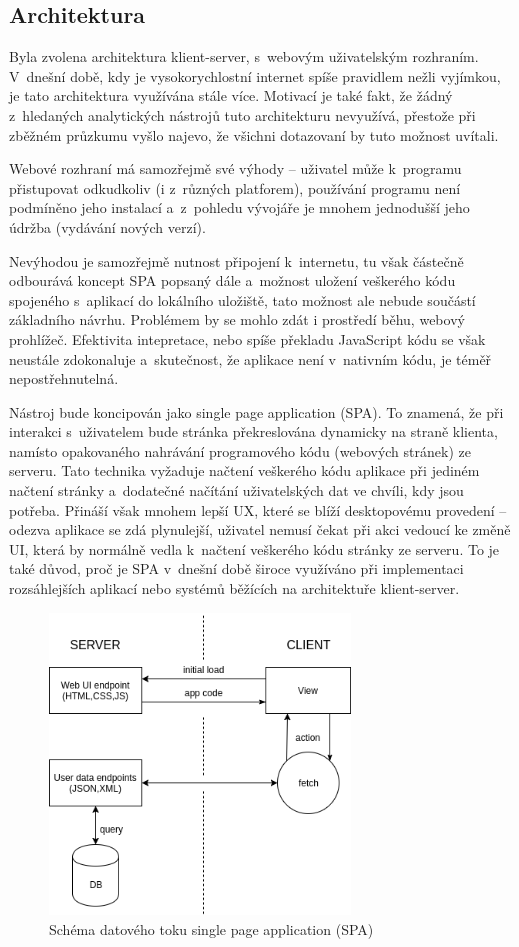 \subsection{Architektura}
Byla zvolena architektura klient-server, s~webovým uživatelským rozhraním. V~dnešní době, kdy je vysokorychlostní internet spíše pravidlem nežli vyjímkou, je tato architektura využívána stále více. Motivací je také fakt, že žádný z~hledaných analytických nástrojů tuto architekturu nevyužívá, přestože při zběžném průzkumu vyšlo najevo, že všichni dotazovaní by tuto možnost uvítali.

Webové rozhraní má samozřejmě své výhody -- uživatel může k~programu přistupovat odkudkoliv (i z~různých platforem), používání programu není podmíněno jeho instalací a~z~pohledu vývojáře je mnohem jednodušší jeho údržba (vydávání nových verzí). 

Nevýhodou je samozřejmě nutnost připojení k~internetu, tu však částečně odbourává koncept SPA popsaný dále a~možnost uložení veškerého kódu spojeného s~aplikací do lokálního uložiště, tato možnost ale nebude součástí základního návrhu. Problémem by se mohlo zdát i prostředí běhu, webový prohlížeč. Efektivita intepretace, nebo spíše překladu JavaScript kódu se však neustále zdokonaluje a~skutečnost, že aplikace není v~nativním kódu, je téměř nepostřehnutelná. 

Nástroj bude koncipován jako single page application (SPA). To znamená, že při interakci s~uživatelem bude stránka překreslována dynamicky na straně klienta, namísto opakovaného nahrávání programového kódu (webových stránek) ze serveru. Tato technika vyžaduje načtení veškerého kódu aplikace při jediném načtení stránky a~dodatečné načítání uživatelských dat ve chvíli, kdy jsou potřeba. Přináší však mnohem lepší UX, které se blíží desktopovému provedení -- odezva aplikace se zdá plynulejší, uživatel nemusí čekat při akci vedoucí ke změně UI, která by normálně vedla k~načtení veškerého kódu stránky ze serveru. To je také důvod, proč je SPA v~dnešní době široce využíváno při implementaci rozsáhlejších aplikací nebo systémů běžících na architektuře klient-server. 


\begin{figure}
  \centering
  \includegraphics[width=8cm]{img/spa.png}
  \caption{Schéma datového toku single page application (SPA)}
\end{figure}

